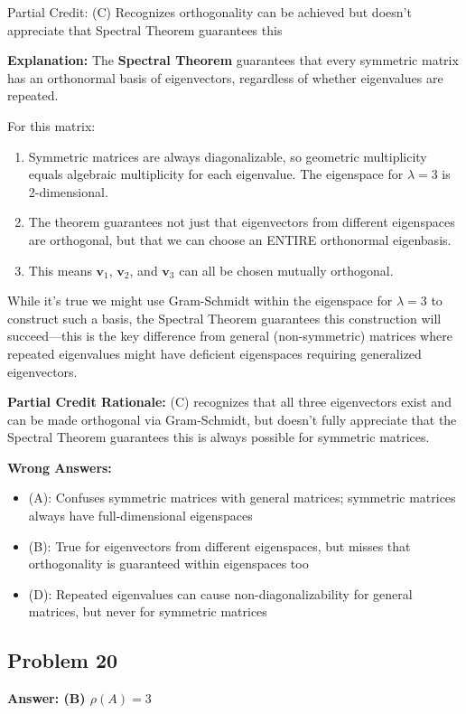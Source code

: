 \documentclass[12pt]{amsart}
\newcommand{\correct}[1]{{\color{correctgreen}\textbf{#1}}}
\newcommand{\partcred}[1]{{\color{partialblue}#1}}
\begin{document}
\partcred{Partial Credit: (C) Recognizes orthogonality can be achieved but doesn't appreciate that Spectral Theorem guarantees this}

\textbf{Explanation:} The \textbf{Spectral Theorem} guarantees that every symmetric matrix has an orthonormal basis of eigenvectors, regardless of whether eigenvalues are repeated.

For this matrix:
\begin{enumerate}
\item Symmetric matrices are always diagonalizable, so geometric multiplicity equals algebraic multiplicity for each eigenvalue. The eigenspace for $\lambda = 3$ is 2-dimensional.
\item The theorem guarantees not just that eigenvectors from different eigenspaces are orthogonal, but that we can choose an ENTIRE orthonormal eigenbasis.
\item This means $\mathbf{v}_1$, $\mathbf{v}_2$, and $\mathbf{v}_3$ can all be chosen mutually orthogonal.
\end{enumerate}

While it's true we might use Gram-Schmidt within the eigenspace for $\lambda = 3$ to construct such a basis, the Spectral Theorem guarantees this construction will succeed—this is the key difference from general (non-symmetric) matrices where repeated eigenvalues might have deficient eigenspaces requiring generalized eigenvectors.

\textbf{Partial Credit Rationale:} (C) recognizes that all three eigenvectors exist and can be made orthogonal via Gram-Schmidt, but doesn't fully appreciate that the Spectral Theorem guarantees this is always possible for symmetric matrices.

\textbf{Wrong Answers:}
\begin{itemize}
\item (A): Confuses symmetric matrices with general matrices; symmetric matrices always have full-dimensional eigenspaces
\item (B): True for eigenvectors from different eigenspaces, but misses that orthogonality is guaranteed within eigenspaces too
\item (D): Repeated eigenvalues can cause non-diagonalizability for general matrices, but never for symmetric matrices
\end{itemize}

\subsection*{Problem 20}
\correct{Answer: (B) $\rho(A) = 3$}
\end{document}
